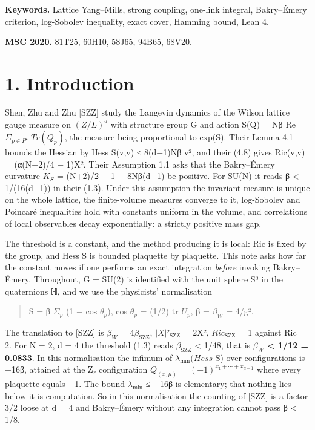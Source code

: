 \documentclass[11pt,a4paper]{article}
\theoremstyle{named}
\begin{document}
\textbf{Keywords.} Lattice Yang–Mills, strong coupling, one-link integral, Bakry–Émery criterion, log-Sobolev inequality, exact cover, Hamming bound, Lean 4.

\textbf{MSC 2020.} 81T25, 60H10, 58J65, 94B65, 68V20.

\section*{1. Introduction}
Shen, Zhu and Zhu [SZZ] study the Langevin dynamics of the Wilson lattice gauge measure on $(Z/L)^d$ with structure group G and action S(Q) = Nβ Re $Σ_{p ∈ P⁺}$ $Tr(Q_p)$, the measure being proportional to exp(S). Their Lemma 4.1 bounds the Hessian by \textbar{}Hess S(v,v)\textbar{} ≤ 8(d−1)N\textbar{}β\textbar{} \textbar{}v\textbar{}², and their (4.8) gives Ric(v,v) = (α(N+2)/4 − 1)\textbar{}X\textbar{}². Their Assumption 1.1 asks that the Bakry–Émery curvature $K_S$ = (N+2)/2 − 1 − 8N\textbar{}β\textbar{}(d−1) be positive. For SU(N) it reads \textbar{}β\textbar{} \textless{} 1/(16(d−1)) in their (1.3). Under this assumption the invariant measure is unique on the whole lattice, the finite-volume measures converge to it, log-Sobolev and Poincaré inequalities hold with constants uniform in the volume, and correlations of local observables decay exponentially: a strictly positive mass gap.

The threshold is a constant, and the method producing it is local: Ric is fixed by the group, and Hess S is bounded plaquette by plaquette. This note asks how far the constant moves if one performs an exact integration \textit{before} invoking Bakry–Émery. Throughout, G = SU(2) is identified with the unit sphere S³ in the quaternions ℍ, and we use the physicists' normalisation

\begin{quote}
S = β $Σ_p$ (1 − cos $θ_p$),  cos $θ_p$ = (1/2) tr $U_p$,  β = $β_W$ = 4/g².
\end{quote}
The translation to [SZZ] is $β_W$ = $4β_{\mathrm{SZZ}}$, $|X|²_{\mathrm{SZZ}}$ = 2\textbar{}X\textbar{}², $Ric_{\mathrm{SZZ}}$ = 1 against Ric = 2. For N = 2, d = 4 the threshold (1.3) reads $β_{\mathrm{SZZ}}$ \textless{} 1/48, that is \textbf{$β_W$ \textless{} 1/12 = 0.0833}. In this normalisation the infimum of $λ_{\min}(Hess$ S) over configurations is −16β, attained at the Z₂ configuration $Q_{(x,μ)}$ = $(−1)^{x₁+⋯+x_{μ−1}}$ where every plaquette equals −1. The bound $λ_{\min}$ ≤ −16β is elementary; that nothing lies below it is computation. So in this normalisation the counting of [SZZ] is a factor 3/2 loose at d = 4 and Bakry–Émery without any integration cannot pass β \textless{} 1/8.
\end{document}
